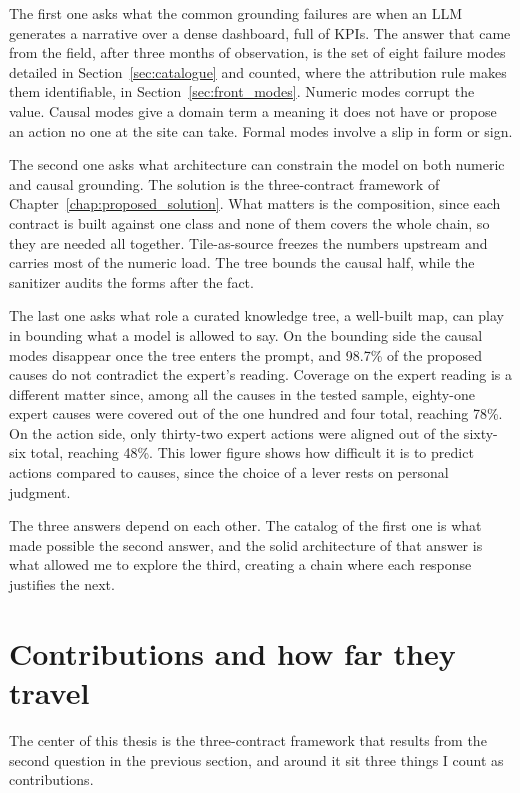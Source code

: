 \documentclass[12pt,a4paper,openright,twoside]{book}
\begin{document}
The first one asks what the common grounding failures are when an \ac{LLM} generates a narrative over a dense dashboard, full of KPIs.
The answer that came from the field, after three months of observation, is the set of eight failure modes detailed in Section~\ref{sec:catalogue} and counted, where the attribution rule makes them identifiable, in Section~\ref{sec:front_modes}.
Numeric modes corrupt the value.
Causal modes give a domain term a meaning it does not have or propose an action no one at the site can take.
Formal modes involve a slip in form or sign.

The second one asks what architecture can constrain the model on both numeric and causal grounding.
The solution is the three-contract framework of Chapter~\ref{chap:proposed_solution}.
What matters is the composition, since each contract is built against one class and none of them covers the whole chain, so they are needed all together.
Tile-as-source freezes the numbers upstream and carries most of the numeric load.
The tree bounds the causal half, while the sanitizer audits the forms after the fact.

The last one asks what role a curated knowledge tree, a well-built map, can play in bounding what a model is allowed to say.
On the bounding side the causal modes disappear once the tree enters the prompt, and 98.7\% of the proposed causes do not contradict the expert's reading.
Coverage on the expert reading is a different matter since, among all the causes in the tested sample, eighty-one expert causes were covered out of the one hundred and four total, reaching 78\%.
On the action side, only thirty-two expert actions were aligned out of the sixty-six total, reaching 48\%.
This lower figure shows how difficult it is to predict actions compared to causes, since the choice of a lever rests on personal judgment.

The three answers depend on each other.
The catalog of the first one is what made possible the second answer, and the solid architecture of that answer is what allowed me to explore the third, creating a chain where each response justifies the next.


\section{Contributions and how far they travel}
\label{sec:contributions}

The center of this thesis is the three-contract framework that results from the second question in the previous section, and around it sit three things I count as contributions.
\end{document}
